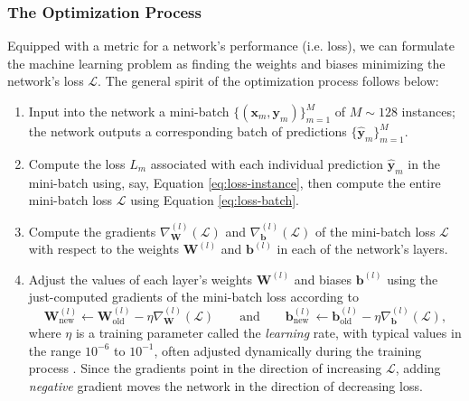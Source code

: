 \documentclass[11pt, a4paper]{article}
\renewcommand{\vec}[1]{\bm{#1}}
\newcommand{\mat}[1]{\mathbf{#1}}
\renewcommand{\grad}{\nabla}
\newcommand{\W}{\mat{W}}
\newcommand{\x}{\vec{x}}
\newcommand{\y}{\vec{y}}
\renewcommand{\b}{\vec{b}}
\begin{document}
\subsubsection{The Optimization Process} \label{sss:optimization}
Equipped with a metric for a network's performance (i.e. loss), we can formulate the machine learning problem as finding the weights and biases minimizing the network's loss $ \mathcal{L} $. The general spirit of the optimization process follows below:
\begin{enumerate}

    \item \label{item:input} Input into the network a mini-batch $ \big\{(\x_{m}, \y_{m})\big\}_{m = 1}^{M} $ of $ M \sim 128 $ instances; the network outputs a corresponding batch of predictions $ \big\{\hat{\y}_{m}\big\}_{m = 1}^{M} $. %

    \item Compute the loss $ L_{m} $ associated with each individual prediction $ \hat{\y}_{m} $ in the mini-batch using, say, Equation \ref{eq:loss-instance}, then compute the entire mini-batch loss $ \mathcal{L} $ using Equation \ref{eq:loss-batch}.

    \item \label{item:backprop} Compute the  gradients $ \grad^{(l)}_{\W} (\mathcal{L}) $ and $ \grad^{(l)}_{\b} (\mathcal{L}) $ of the mini-batch loss $ \mathcal{L} $ with respect to the weights $ \W^{(l)} $ and $ \b^{(l)} $ in each of the network's layers.

    \item \label{item:update-params} Adjust the values of each layer's weights $ \W^{(l)} $ and biases $ \b^{(l)} $ using the just-computed gradients of the mini-batch loss according to
    \begin{equation*}
        \W^{(l)}_{\text{new}} \leftarrow \W^{(l)}_{\text{old}} - \eta \grad^{(l)}_{\W}(\mathcal{L}) \qquad \text{and} \qquad \b^{(l)}_{\text{new}} \leftarrow \b^{(l)}_{\text{old}} - \eta \grad^{(l)}_{\b}(\mathcal{L}),
    \end{equation*}
    where $ \eta $ is a training parameter called the \textit{learning} rate, with typical values in the range $ 10^{-6} $ to $ 10^{-1} $, often adjusted dynamically during the training process \cite{homl}. Since the gradients point in the direction of increasing $ \mathcal{L} $, adding \textit{negative} gradient moves the network in the direction of decreasing loss.
    

\end{enumerate}
\end{document}
